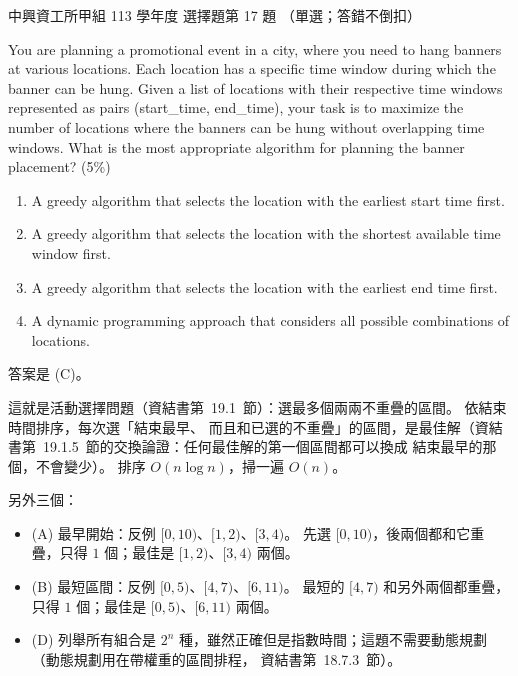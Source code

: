 \begin{pastexam}[label={px:nchu-113-dsa-17}]{中興資工所甲組 113 學年度 選擇題第 17 題}
（單選；答錯不倒扣）

You are planning a promotional event in a city, where you need to hang banners at various locations. Each
location has a specific time window during which the banner can be hung. Given a list of locations with
their respective time windows represented as pairs (start\_time, end\_time), your task is to maximize the
number of locations where the banners can be hung without overlapping time windows. What is the most
appropriate algorithm for planning the banner placement? (5\%)
\begin{enumerate}[label=(\Alph*)]
\item A greedy algorithm that selects the location with the earliest start time first.
\item A greedy algorithm that selects the location with the shortest available time window first.
\item A greedy algorithm that selects the location with the earliest end time first.
\item A dynamic programming approach that considers all possible combinations of locations.
\end{enumerate}
\end{pastexam}

\begin{pastsoln}
答案是 (C)。

這就是活動選擇問題（資結書第~19.1~節）：選最多個兩兩不重疊的區間。 依結束時間排序，每次選「結束最早、
而且和已選的不重疊」的區間，是最佳解（資結書第~19.1.5~節的交換論證：任何最佳解的第一個區間都可以換成
結束最早的那個，不會變少）。 排序 $O(n \log n)$，掃一遍 $O(n)$。

另外三個：
\begin{itemize}
\item (A) 最早開始：反例 $[0, 10)$、$[1, 2)$、$[3, 4)$。 先選 $[0, 10)$，後兩個都和它重疊，只得 $1$ 個；最佳是
$[1, 2)$、$[3, 4)$ 兩個。
\item (B) 最短區間：反例 $[0, 5)$、$[4, 7)$、$[6, 11)$。 最短的 $[4, 7)$ 和另外兩個都重疊，只得 $1$ 個；最佳是
$[0, 5)$、$[6, 11)$ 兩個。
\item (D) 列舉所有組合是 $2^n$ 種，雖然正確但是指數時間；這題不需要動態規劃（動態規劃用在帶權重的區間排程，
資結書第~18.7.3~節）。
\end{itemize}
\end{pastsoln}
